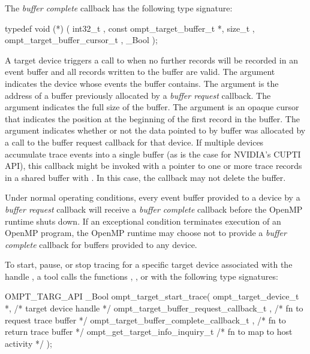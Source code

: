 \documentclass{article}
\begin{document}
The \emph{buffer complete} callback has the following type signature: 
\begin{boxedcode}
typedef void (*) (
  int32\_t , 
  const ompt\_target\_buffer\_t *,
  size\_t ,
  ompt\_target\_buffer\_cursor\_t ,
  \_Bool 
);
\end{boxedcode}
A target device triggers a call to  when no further records will be recorded in an event buffer and all records written to the buffer are valid. 
The argument  indicates the device whose events the buffer contains. The argument  is the address of a buffer previously allocated by a \emph{buffer request} callback. The argument  indicates the full size of the buffer. The argument  is an opaque cursor that indicates the position at the beginning of the first record in the buffer. The argument  indicates whether or not the data pointed to by buffer was allocated by a call to the buffer request callback for that device. If multiple devices accumulate trace events into a single buffer (as is the case for NVIDIA's CUPTI API), this callback might be invoked with a pointer to one or more trace records in a shared buffer with . In this case, the callback may not delete the buffer.

Under normal operating conditions, every event buffer provided to a device by a \emph{buffer request} callback will receive a \emph{buffer complete} callback before the OpenMP runtime shuts down. If an exceptional condition terminates  execution of an OpenMP program, the OpenMP runtime may choose not to provide a \emph{buffer complete} callback for buffers provided to any device.

To start, pause, or stop tracing for a specific target device associated with the handle , 
a tool calls the functions , , or  with the following type signatures:
\begin{boxedcode}
OMPT\_TARG\_API \_Bool ompt\_target\_start\_trace(
  ompt\_target\_device\_t *,                     /* target device handle       */
  ompt\_target\_buffer\_request\_callback\_t ,    /* fn to request trace buffer */
  ompt\_target\_buffer\_complete\_callback\_t ,  /* fn to return trace buffer  */
  ompt\_get\_target\_info\_inquiry\_t            /* fn to map to host activity */
);
\end{boxedcode}
\end{document}
